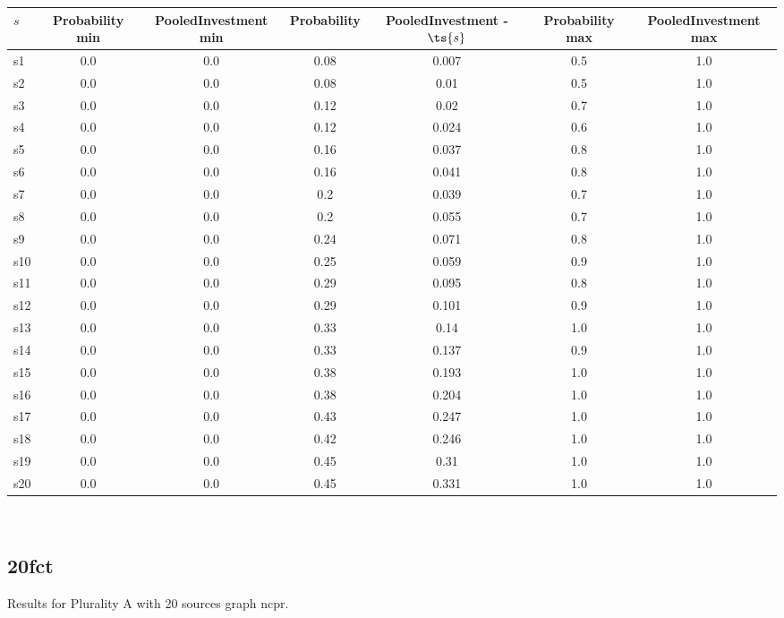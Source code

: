 \documentclass{article}
\begin{document}
\noindent\begin{tabular}{|l|c|c|c|c|c|c|}
\hline
$s$& Probability min & PooledInvestment min & Probability & PooledInvestment - $\ts{s}$ & Probability max & PooledInvestment max\\
\hline
s1 &0.0 & 0.0 & 0.08 & 0.007 & 0.5 & 1.0\\
\hline
s2 &0.0 & 0.0 & 0.08 & 0.01 & 0.5 & 1.0\\
\hline
s3 &0.0 & 0.0 & 0.12 & 0.02 & 0.7 & 1.0\\
\hline
s4 &0.0 & 0.0 & 0.12 & 0.024 & 0.6 & 1.0\\
\hline
s5 &0.0 & 0.0 & 0.16 & 0.037 & 0.8 & 1.0\\
\hline
s6 &0.0 & 0.0 & 0.16 & 0.041 & 0.8 & 1.0\\
\hline
s7 &0.0 & 0.0 & 0.2 & 0.039 & 0.7 & 1.0\\
\hline
s8 &0.0 & 0.0 & 0.2 & 0.055 & 0.7 & 1.0\\
\hline
s9 &0.0 & 0.0 & 0.24 & 0.071 & 0.8 & 1.0\\
\hline
s10 &0.0 & 0.0 & 0.25 & 0.059 & 0.9 & 1.0\\
\hline
s11 &0.0 & 0.0 & 0.29 & 0.095 & 0.8 & 1.0\\
\hline
s12 &0.0 & 0.0 & 0.29 & 0.101 & 0.9 & 1.0\\
\hline
s13 &0.0 & 0.0 & 0.33 & 0.14 & 1.0 & 1.0\\
\hline
s14 &0.0 & 0.0 & 0.33 & 0.137 & 0.9 & 1.0\\
\hline
s15 &0.0 & 0.0 & 0.38 & 0.193 & 1.0 & 1.0\\
\hline
s16 &0.0 & 0.0 & 0.38 & 0.204 & 1.0 & 1.0\\
\hline
s17 &0.0 & 0.0 & 0.43 & 0.247 & 1.0 & 1.0\\
\hline
s18 &0.0 & 0.0 & 0.42 & 0.246 & 1.0 & 1.0\\
\hline
s19 &0.0 & 0.0 & 0.45 & 0.31 & 1.0 & 1.0\\
\hline
s20 &0.0 & 0.0 & 0.45 & 0.331 & 1.0 & 1.0\\
\hline
\end{tabular}\\

\newpage

\subsection{20fct}

\noindent Results for Plurality A with 20 sources graph ncpr.
\end{document}
